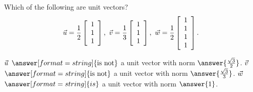 \documentclass{ximera}
\author{Zack Reed}
\begin{document}
\begin{exercise}

Which of the following are unit vectors?
\begin{equation*}
  \vect{u}=\frac{1}{2}\startmat{c}1\\1\\1\stopmat, \quad
  \vect{v}=\frac{1}{3}\startmat{c}1\\1\\1\stopmat, \quad
  \vect{w}=\frac{1}{2}\startmat{c}1\\1\\1\\1\stopmat.
\end{equation*}

$\vect{u}$ $\answer[format=string]{\text{is not}}$ a unit vector with norm $\answer{\frac{\sqrt{3}}{2}}$. $\vect{v}$ $\answer[format=string]{\text{is not}}$ a unit vector with norm $\answer{\frac{\sqrt{3}}{3}}$. $\vect{w}$ $\answer[format=string]{is}$ a unit vector with norm $\answer{1}$.

\end{exercise}
\end{document}
